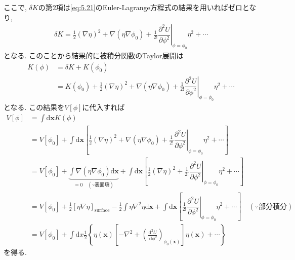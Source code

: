 \documentclass[dvipdfmx,11pt,a4paper,oneside,openany]{jsbook}
\begin{document}
ここで, $\delta K$の第2項は\eqref{eq:5.21}のEuler-Lagrange方程式の結果を用いればゼロとなり,
\begin{align*}
    \delta K=\frac{1}{2}(\nabla\eta)^2+\nabla(\eta\nabla\phi_0)+\frac{1}{2!}\left.\dfrac{\partial^2 U}{\partial \phi^2}\right|_{\phi=\phi_0}\eta^2+\cdots
\end{align*}
となる. このことから結果的に被積分関数のTaylor展開は
\begin{align*}
    K(\phi) & =\delta K+K(\phi_0)                                                                                                                                     \\
            & =K(\phi_0)+\frac{1}{2}(\nabla\eta)^2+\nabla(\eta\nabla\phi_0)+\frac{1}{2!}\left.\dfrac{\partial^2 U}{\partial \phi^2}\right|_{\phi=\phi_0}\eta^2+\cdots
\end{align*}
となる. この結果を$V[\phi]$に代入すれば
\begin{align}
    V[\phi] & =\int\mathrm{d}\bm{x} K(\phi)\nonumber                                                                                                                                                                                                                                                             \\
            & =V[\phi_0]+\int\mathrm{d}\bm{x}\left[\frac{1}{2}(\nabla\eta)^2+\nabla(\eta\nabla\phi_0)+\frac{1}{2!}\left.\dfrac{\partial^2 U}{\partial \phi^2}\right|_{\phi=\phi_0}\eta^2+\cdots\right] \nonumber                                                                                                 \\
            & =V[\phi_0]+\underbrace{\int\nabla(\eta\nabla\phi_0)\mathrm{d}\bm{x}}_{=0\quad (\because \text{表面項})}+\int\mathrm{d}\bm{x}\left[\frac{1}{2}(\nabla\eta)^2+\frac{1}{2!}\left.\dfrac{\partial^2 U}{\partial \phi^2}\right|_{\phi=\phi_0}\eta^2+\cdots\right]\nonumber                              \\
            & =V[\phi_0]+\frac{1}{2}\left[\eta\nabla\eta\right]_{\text{surface}}-\frac{1}{2}\int\eta\nabla^2\eta\mathrm{d}\bm{x}+\int\mathrm{d}\bm{x}\left[\frac{1}{2!}\left.\dfrac{\partial^2 U}{\partial \phi^2}\right|_{\phi=\phi_0}\eta^2+\cdots\right]\quad \left(\because \text{部分積分}\right) \nonumber \\
            & =V\left[\phi_{0}\right]+\int \mathrm{d} x \frac{1}{2}\left\{\eta(\boldsymbol{x})\left[-\nabla^{2}+\left(\frac{\mathrm{d}^{2} U}{\mathrm{~d} \phi^{2}}\right)_{\phi_{0}(\boldsymbol{x})}\right] \eta(\boldsymbol{x})+\cdots\right\}
\end{align}
を得る.




\end{document}
